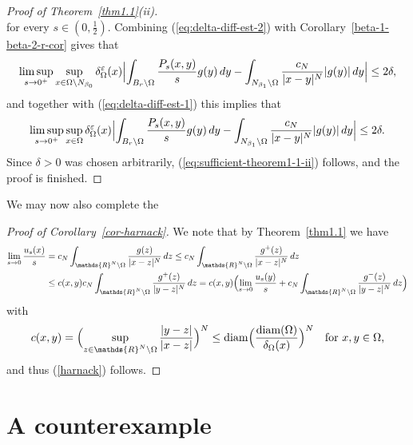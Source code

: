 \documentclass[notitlepage,11pt,reqno]{amsart}
\theoremstyle{definition}
\numberwithin{equation}{section}
\newcommand{\eps}{{\varepsilon}}
\newcommand{\RR}{\mathds{R}}
\DeclareMathOperator*{\diam}{diam}
\begin{document}
\begin{proof}[Proof of Theorem~\ref{thm1.1}(ii)]
\begin{equation}
\end{equation}
for every $s \in (0,\frac{1}{2})$. Combining (\ref{eq:delta-diff-est-2}) with Corollary~\ref{beta-1-beta-2-r-cor} gives that
\begin{equation*}
  \label{eq:delta-diff-est-3}
\limsup_{s \to 0^+} \sup_{x \in \Omega \setminus N_{\beta_0}} \delta^\eps_\Omega(x) \Bigl|\int_{B_r \setminus \Omega}\frac{P_s(x, y)}{s}g(y)\, dy- \int_{N_{\beta_1} \setminus \Omega}\frac{c_N}{|x-y|^N}|g(y)|\, dy\Bigr| \le 2 \delta,
\end{equation*}
and together with (\ref{eq:delta-diff-est-1}) this implies that
$$
\limsup_{s \to 0^+} \sup_{x \in \Omega} \delta^\eps_\Omega(x) \Bigl|\int_{B_r \setminus \Omega}\frac{P_s(x, y)}{s}g(y)\, dy- \int_{N_{\beta_1} \setminus \Omega}\frac{c_N}{|x-y|^N}|g(y)|\, dy\Bigr| \le 2 \delta.
$$
Since $\delta>0$ was chosen arbitrarily, (\ref{eq:sufficient-theorem1-1-ii}) follows, and the proof is finished.
\end{proof}



We may now also complete the

\begin{proof}[Proof of Corollary~\ref{cor-harnack}]
We note that by Theorem~\ref{thm1.1} we have 
\begin{align*}
    \lim_{s\to 0}\frac{u_s(x)}{s}&=c_N\int_{\RR^N\setminus \Omega}\frac{g(z)}{|x-z|^N}\,dz \leq c_N\int_{\RR^N\setminus \Omega}\frac{g^+(z)}{|x-z|^N}\,dz\\
                                 &\leq c(x,y) c_N\int_{\RR^N\setminus \Omega}\frac{g^+(z)}{|y-z|^N}\,dz = c(x,y) \Bigl(\lim_{s\to 0}\frac{u_s(y)}{s} + c_N\int_{\RR^N\setminus \Omega}\frac{g^-(z)}{|y-z|^N}\,dz\Bigr)
    \end{align*}
    with
    $$
    c(x,y) = \Bigl(\sup_{z \in \RR^N\setminus \Omega} \frac{|y-z|}{|x-z|}\Bigr)^N \le \diam \Bigl(\frac{\diam(\Omega)}{\delta_\Omega(x)}\Bigr)^N \quad \text{for $x,y \in \Omega$,}
    $$
and thus (\ref{harnack}) follows. 
\end{proof}

\section{A counterexample}
\label{sec:counterexample}
\end{document}
